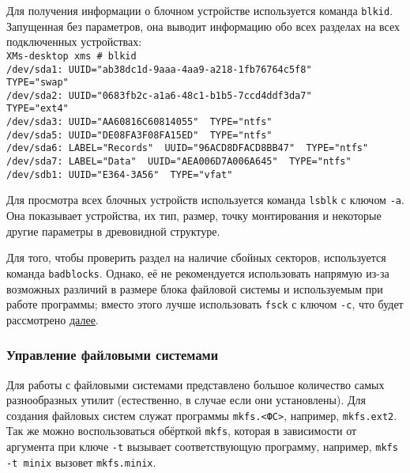 Для получения информации о блочном устройстве используется команда \texttt{blkid}. Запущенная без параметров, она выводит информацию обо всех разделах на всех подключенных устройствах:\\
 \texttt{XMs-desktop xms \# blkid \\
 /dev/sda1: UUID="ab38dc1d-9aaa-4aa9-a218-1fb76764c5f8"\\ TYPE="swap"\\
 /dev/sda2: UUID="0683fb2c-a1a6-48c1-b1b5-7ccd4ddf3da7"\\ TYPE="ext4"\\
 /dev/sda3: UUID="AA60816C60814055"\, TYPE="ntfs"\\
 /dev/sda5: UUID="DE08FA3F08FA15ED"\, TYPE="ntfs"\\
 /dev/sda6: LABEL="Records"\, UUID="96ACD8DFACD8BB47"\, TYPE="ntfs"\\
 /dev/sda7: LABEL="Data"\, UUID="AEA006D7A006A645"\, TYPE="ntfs" \\
 /dev/sdb1: UUID="E364-3A56"\, TYPE="vfat"}

Для просмотра всех блочных устройств используется команда \texttt{lsblk} с ключом \texttt{-a}. Она показывает устройства, их тип, размер, точку монтирования и некоторые другие параметры в древовидной структуре.

Для того, чтобы проверить раздел на наличие сбойных секторов, используется команда \texttt{badblocks}. Однако, её не рекомендуется использовать напрямую из-за возможных различий в размере блока файловой системы и используемым при работе программы; вместо этого лучше использовать \texttt{fsck} с ключом \texttt{-c}, что будет рассмотрено \hyperref[base:os:structure:sysutils:fs]{далее}.

\subsubsection{Управление файловыми системами}\label{base:os:structure:sysutils:fs}
Для работы с файловыми системами представлено большое количество самых разнообразных утилит (естественно, в случае если они установлены). Для создания файловых систем служат программы \texttt{mkfs.<ФС>}, например, \texttt{mkfs.ext2}. Так же можно воспользоваться обёрткой \texttt{mkfs}, которая в зависимости от аргумента при ключе \texttt{-t} вызывает соответствующую программу, например, \texttt{mkfs -t min\-ix} вызовет \texttt{mkfs.mi\-nix}.

